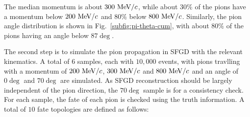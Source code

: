           The median momentum is about $300~\textrm{MeV}/c$, while about $30\%$ of the pions have a momentum below $200~\textrm{MeV}/c$ and $80\%$ below $800~\textrm{MeV}/c$.
          Similarly, the pion angle distribution is shown in Fig.~\ref{subfig:pi-theta-cum}, with about $80\%$ of the pions having an angle below $87\deg$.
          \begin{figure}[h]
            \centering
          \end{figure}

          The second step is to simulate the pion propagation in SFGD with the relevant kinematics.
          A total of $6$ samples, each with $10,000$ events, with pions travlling with a momentum of $200~\textrm{MeV}/c$, $300~\textrm{MeV}/c$ and $800~\textrm{MeV}/c$ and an angle of $0\deg$ and $70\deg$ are simulated.
          As SFGD reconstruction should be largely independent of the pion direction, the $70\deg$ sample is for a consistency check.
          For each sample, the fate of each pion is checked using the truth information.
          A total of $10$ fate topologies are defined as follows:
